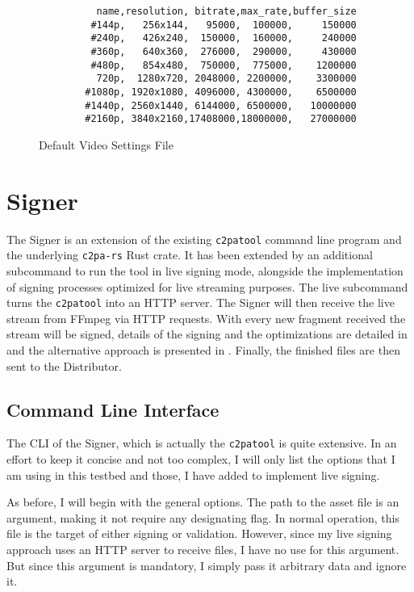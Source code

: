 \begin{figure}
    \centering
    \begin{lstlisting}
          name,resolution, bitrate,max_rate,buffer_size
         #144p,   256x144,   95000,  100000,     150000
         #240p,   426x240,  150000,  160000,     240000
         #360p,   640x360,  276000,  290000,     430000
         #480p,   854x480,  750000,  775000,    1200000
          720p,  1280x720, 2048000, 2200000,    3300000
        #1080p, 1920x1080, 4096000, 4300000,    6500000
        #1440p, 2560x1440, 6144000, 6500000,   10000000
        #2160p, 3840x2160,17408000,18000000,   27000000
    \end{lstlisting}
    \caption{Default Video Settings File}
    \label{list:video}
\end{figure}

\section{Signer\label{sec:signer}}

The Signer is an extension of the existing \texttt{c2patool} command line program and the underlying \texttt{c2pa-rs} Rust crate. It has been extended by an additional subcommand to run the tool in live signing mode, alongside the implementation of signing processes optimized for live streaming purposes. The live subcommand turns the \texttt{c2patool} into an HTTP server. The Signer will then receive the live stream from FFmpeg via HTTP requests. With every new fragment received the stream will be signed, details of the signing and the optimizations are detailed in  and the alternative approach is presented in . Finally, the finished files are then sent to the Distributor.

\subsection{Command Line Interface\label{sec:cli_signer}}

The CLI of the Signer, which is actually the \texttt{c2patool} is quite extensive. In an effort to keep it concise and not too complex, I will only list the options that I am using in this testbed and those, I have added to implement live signing.

As before, I will begin with the general options. The path to the asset file is an argument, making it not require any designating flag. In normal operation, this file is the target of either signing or validation. However, since my live signing approach uses an HTTP server to receive files, I have no use for this argument. But since this argument is mandatory, I simply pass it arbitrary data and ignore it.

